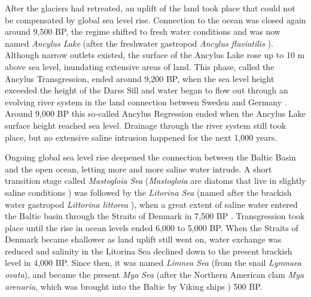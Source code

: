 After the glaciers had retreated, an uplift of the land took place that could not be compensated by global sea level rise. Connection to the ocean was closed again around 9,500 BP, the regime shifted to fresh water conditions and was now named \textit{Ancylus Lake} (after the freshwater gastropod \textit{Ancylus fluviatilis} \citep[][]{tikkanen2002}). Although narrow outlets existed, the surface of the Ancylus Lake rose up to 10 m above sea level, inundating extensive areas of land. This phase, called the Ancylus Transgression, ended around 9,200 BP, when the sea level height exceeded the height of the Darss Sill and water began to flow out through an evolving river system in the land connection between Sweden and Germany \citep[][]{tikkanen2002}. Around 9,000 BP this so-called Ancylus Regression ended when the Ancylus Lake surface height reached sea level. Drainage through the river system still took place, but no extensive saline intrusion happened for the next 1,000 years.

Ongoing global sea level rise deepened the connection between the Baltic Basin and the open ocean, letting more and more saline water intrude. A short transition stage called \textit{Mastogloia Sea} (\textit{Mastogloia} are diatoms that live in slightly saline conditions \citep[][]{eronen2001}) was followed by the \textit{Litorina Sea} (named after the brackish water gastropod \textit{Littorina littorea} \citep[][]{eronen2001}), when a great extent of saline water entered the Baltic basin through the Straits of Denmark in 7,500 BP \citep[][]{bjoerk95}. Transgression took place until the rise in ocean levels ended 6,000 to 5,000 BP. When the Straits of Denmark became shallower as land uplift still went on, water exchange was reduced and salinity in the Litorina Sea declined down to the present brackish level in 4,000 BP. Since then, it was named \textit{Limnea Sea} (from the snail \textit{Lymnaea ovata}), and became the present \textit{Mya Sea} (after the Northern American clam \textit{Mya arenaria}, which was brought into the Baltic by Viking ships \citep[][]{bjoerck2008}) 500 BP.


